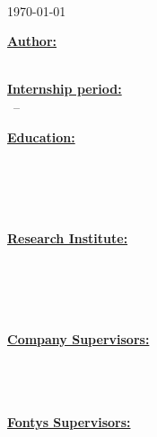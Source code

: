 \begin{center}
    {\huge \reportTitle}\\[1em]
    {\large \today}
\end{center}

\vspace{3cm}

\noindent
\begin{minipage}[t]{0.45\textwidth}
\large\textbf{\underline{Author:}}\\
\studentName\\
\href{mailto:\studentEmail}{\studentEmail}
\end{minipage}
\hfill
\begin{minipage}[t]{0.45\textwidth}
\large\textbf{\underline{Internship period:}}\\
\periodStart\ -- \periodEnd
\end{minipage}

\vspace{1cm}

\noindent
\begin{minipage}[t]{0.45\textwidth}
\large\textbf{\underline{Education:}}\\
\href{\instituteURL}{\instituteName}\\
\studyProgram\\
\instituteStreet\\
\institutePostcodeCity\\
\instituteCountry
\end{minipage}
\hfill
\begin{minipage}[t]{0.45\textwidth}
\large\textbf{\underline{Research Institute:}}\\
\href{\companyURL}{\companyName}\\
\companyDepartment\\
\companyStreet\\
\companyPostcodeCity\\
\companyCountry
\end{minipage}

\vspace{1cm}

\noindent
\begin{minipage}[t]{0.45\textwidth}
\large\textbf{\underline{Company Supervisors:}}\\
\companySupOneName\\
\href{mailto:\companySupOneEmail}{\companySupOneEmail}\\[0.3cm]
\companySupTwoName\\
\href{mailto:\companySupTwoEmail}{\companySupTwoEmail}
\end{minipage}
\hfill
\begin{minipage}[t]{0.45\textwidth}
\large\textbf{\underline{Fontys Supervisors:}}\\
\fontysSupOneName\\
\href{mailto:\fontysSupOneEmail}{\fontysSupOneEmail}\\[0.3cm]
\fontysSupTwoName\\
\href{mailto:\fontysSupTwoEmail}{\fontysSupTwoEmail}
\end{minipage}
